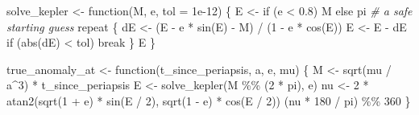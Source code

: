 \documentclass[
  10.5pt,
  letterpaper,
]{scrbook}
\newenvironment{Shaded}{\begin{snugshade}}{\end{snugshade}}
\newcommand{\AttributeTok}[1]{\textcolor[rgb]{0.00,0.00,0.00}{#1}}
\newcommand{\CommentTok}[1]{\textcolor[rgb]{0.00,0.00,0.00}{\textit{#1}}}
\newcommand{\ControlFlowTok}[1]{\textcolor[rgb]{0.00,0.00,0.00}{#1}}
\newcommand{\DecValTok}[1]{\textcolor[rgb]{0.00,0.00,0.00}{#1}}
\newcommand{\FloatTok}[1]{\textcolor[rgb]{0.00,0.00,0.00}{#1}}
\newcommand{\FunctionTok}[1]{\textcolor[rgb]{0.00,0.00,0.00}{#1}}
\newcommand{\NormalTok}[1]{\textcolor[rgb]{0.00,0.00,0.00}{#1}}
\newcommand{\OtherTok}[1]{\textcolor[rgb]{0.00,0.00,0.00}{#1}}
\newcommand{\SpecialCharTok}[1]{\textcolor[rgb]{0.00,0.00,0.00}{#1}}
\theoremstyle{definition}
\theoremstyle{plain}
\theoremstyle{remark}
\begin{document}
\begin{Shaded}
\begin{Highlighting}[]
\NormalTok{solve\_kepler }\OtherTok{\textless{}{-}} \ControlFlowTok{function}\NormalTok{(M, e, }\AttributeTok{tol =} \FloatTok{1e{-}12}\NormalTok{) \{}
\NormalTok{  E }\OtherTok{\textless{}{-}} \ControlFlowTok{if}\NormalTok{ (e }\SpecialCharTok{\textless{}} \FloatTok{0.8}\NormalTok{) M }\ControlFlowTok{else}\NormalTok{ pi          }\CommentTok{\# a safe starting guess}
  \ControlFlowTok{repeat}\NormalTok{ \{}
\NormalTok{    dE }\OtherTok{\textless{}{-}}\NormalTok{ (E }\SpecialCharTok{{-}}\NormalTok{ e }\SpecialCharTok{*} \FunctionTok{sin}\NormalTok{(E) }\SpecialCharTok{{-}}\NormalTok{ M) }\SpecialCharTok{/}\NormalTok{ (}\DecValTok{1} \SpecialCharTok{{-}}\NormalTok{ e }\SpecialCharTok{*} \FunctionTok{cos}\NormalTok{(E))}
\NormalTok{    E  }\OtherTok{\textless{}{-}}\NormalTok{ E }\SpecialCharTok{{-}}\NormalTok{ dE}
    \ControlFlowTok{if}\NormalTok{ (}\FunctionTok{abs}\NormalTok{(dE) }\SpecialCharTok{\textless{}}\NormalTok{ tol) }\ControlFlowTok{break}
\NormalTok{  \}}
\NormalTok{  E}
\NormalTok{\}}

\NormalTok{true\_anomaly\_at }\OtherTok{\textless{}{-}} \ControlFlowTok{function}\NormalTok{(t\_since\_periapsis, a, e, mu) \{}
\NormalTok{  M  }\OtherTok{\textless{}{-}} \FunctionTok{sqrt}\NormalTok{(mu }\SpecialCharTok{/}\NormalTok{ a}\SpecialCharTok{\^{}}\DecValTok{3}\NormalTok{) }\SpecialCharTok{*}\NormalTok{ t\_since\_periapsis}
\NormalTok{  E  }\OtherTok{\textless{}{-}} \FunctionTok{solve\_kepler}\NormalTok{(M }\SpecialCharTok{\%\%}\NormalTok{ (}\DecValTok{2} \SpecialCharTok{*}\NormalTok{ pi), e)}
\NormalTok{  nu }\OtherTok{\textless{}{-}} \DecValTok{2} \SpecialCharTok{*} \FunctionTok{atan2}\NormalTok{(}\FunctionTok{sqrt}\NormalTok{(}\DecValTok{1} \SpecialCharTok{+}\NormalTok{ e) }\SpecialCharTok{*} \FunctionTok{sin}\NormalTok{(E }\SpecialCharTok{/} \DecValTok{2}\NormalTok{), }\FunctionTok{sqrt}\NormalTok{(}\DecValTok{1} \SpecialCharTok{{-}}\NormalTok{ e) }\SpecialCharTok{*} \FunctionTok{cos}\NormalTok{(E }\SpecialCharTok{/} \DecValTok{2}\NormalTok{))}
\NormalTok{  (nu }\SpecialCharTok{*} \DecValTok{180} \SpecialCharTok{/}\NormalTok{ pi) }\SpecialCharTok{\%\%} \DecValTok{360}
\NormalTok{\}}
\end{Highlighting}
\end{Shaded}
\end{document}
